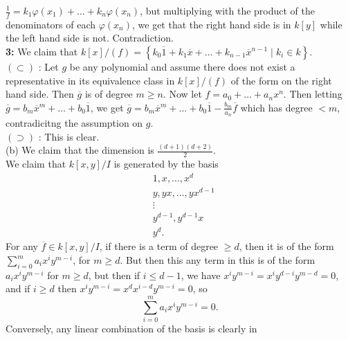 \documentclass[a4paper]{article}
\begin{document}
    $ \frac{1}{f} = k_1 \varphi(x_1) + \ldots + k_n \varphi(x_n)$, but
    multiplying with the product of the denominators of each
    $\varphi(x_n)$, we get that the right hand side is in
    $k\left[ y \right] $ while the left hand side is not. Contradiction.\\
    \linebreak
    \textbf{3:} We claim that
    $k\left[ x \right] / (f) = \left\{k_0 \overline{1} + k_1 \overline{x}+
     \ldots + k_{n-1} \overline{x}^{n-1}  \mid k_i \in k \right\} $.\\
     $(\subset )$ : Let $g$ be any polynomial and assume
     there does not exist a representative in its equivalence class
     in $k\left[ x \right] / (f)$ of the form on the right hand side.
     Then $\overline{g}$ is of degree $m \ge n$. Now let
     $f = a_0 + \ldots + a_n x^{n}$. Then letting
     $\overline{g} = b_{m} \overline{x}^{m} +\ldots + b_0 \overline{1}$, we 
     get 
     $\overline{g} = b_m \overline{x}^{m} + \ldots + b_0 \overline{1}
     - \frac{b_m}{a_n} \overline{f}$ which has degree
     $< m$, contradicitng the assumption on $g$.\\
     \linebreak
     $\left( \supset \right) $ : This is clear.\\
     \linebreak
     (b) We claim that the dimension is
     $\frac{(d+1)(d+2)}{2}$.\\
     \linebreak
     We claim that $k\left[ x,y \right] /I$ is generated
     by the basis
     \begin{align*}
         &1, x, \ldots, x^{d}\\
          &y, yx, \ldots, yx^{d-1}\\
          &\vdots \\
               &y^{d-1}, y^{d-1}x\\
               &y^{d}.
     \end{align*}
     For any $\overline{f} \in k\left[ x,y \right] /I$, if there is a term
     of degree $\ge d$, then it is of the form
     $\sum_{i=0}^{m} a_i x^{i}y^{m-i}$, for $m\ge d$. But then
     this any term in this is of the form
     $a_i x^{i} y^{m-i}$ for $m\ge d$, but then if $i\le d-1$, we have
     $x^{i} y^{m-i} = x^{i} y^{d-i} y^{m-d} = 0$, and if 
     $i\ge d$ then $x^{i} y^{m-i} = x^{d} x^{i-d} y^{m-i} = 0$, so
     \[
     \sum_{i=0}^{m} a_i x^{i}y^{m-i} = 0.
     \] 
     Conversely, any linear combination of the basis is clearly in
\end{document}
